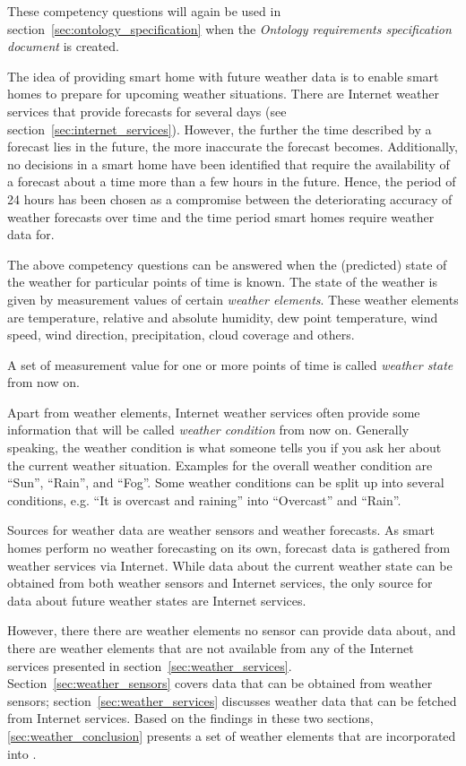 These competency questions will again be used in section~\ref{sec:ontology_specification} when the \emph{Ontology requirements specification document} is created.

The idea of providing smart home with future weather data is to enable smart homes to prepare for upcoming weather situations. There are Internet weather services that provide forecasts for several days (see section~\ref{sec:internet_services}). However, the further the time described by a forecast lies in the future, the more inaccurate the forecast becomes\cite{forecast_error1,forecast_error2}. Additionally, no decisions in a smart home have been identified that require the availability of a forecast about a time more than a few hours in the future. Hence, the period of 24 hours has been chosen as a compromise between the deteriorating accuracy of weather forecasts over time and the time period smart homes require weather data for.

The above competency questions can be answered when the (predicted) state of the weather for particular points of time is known. The state of the weather is given by measurement values of certain \emph{weather elements}. These weather elements are temperature, relative and absolute humidity, dew point temperature, wind speed, wind direction, precipitation, cloud coverage and others.\cite{GlossaryOfMeteorology}

A set of measurement value for one or more points of time is called \emph{weather state} from now on.

Apart from weather elements, Internet weather services often provide some information that will be called \emph{weather condition} from now on. Generally speaking, the weather condition is what someone tells you if you ask her about the current weather situation. Examples for the overall weather condition are ``Sun'', ``Rain'', and ``Fog''. Some weather conditions can be split up into several conditions, e.g. ``It is overcast and raining'' into ``Overcast'' and ``Rain''.

Sources for weather data are weather sensors and weather forecasts. As smart homes perform no weather forecasting on its own, forecast data is gathered from weather services via Internet. While data about the current weather state can be obtained from both weather sensors and Internet services, the only source for data about future weather states are Internet services.

However, there there are weather elements no sensor can provide data about, and there are weather elements that are not available from any of the Internet services presented in section~\ref{sec:weather_services}. Section~\ref{sec:weather_sensors} covers data that can be obtained from weather sensors; section~\ref{sec:weather_services} discusses weather data that can be fetched from Internet services. Based on the findings in these two sections, \ref{sec:weather_conclusion} presents a set of weather elements that are incorporated into \smarthomeweather.

